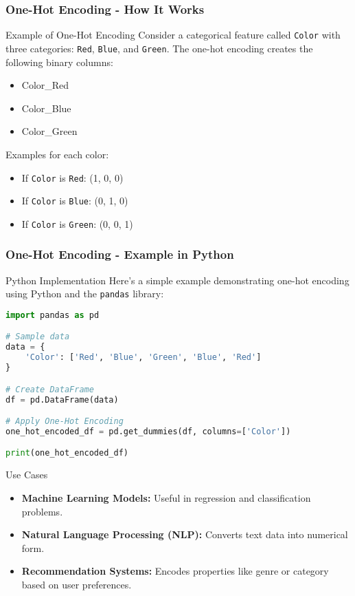 \documentclass[aspectratio=169]{beamer}
\begin{document}
\begin{frame}[fragile]
    \frametitle{One-Hot Encoding - How It Works}
    \begin{block}{Example of One-Hot Encoding}
        Consider a categorical feature called \texttt{Color} with three categories: 
        \texttt{Red}, \texttt{Blue}, and \texttt{Green}. The one-hot encoding creates 
        the following binary columns:
        \begin{itemize}
            \item Color\_Red
            \item Color\_Blue
            \item Color\_Green
        \end{itemize}
        
        Examples for each color:
        \begin{itemize}
            \item If \texttt{Color} is \texttt{Red}: (1, 0, 0)
            \item If \texttt{Color} is \texttt{Blue}: (0, 1, 0)
            \item If \texttt{Color} is \texttt{Green}: (0, 0, 1)
        \end{itemize}
    \end{block}
\end{frame}

\begin{frame}[fragile]
    \frametitle{One-Hot Encoding - Example in Python}
    \begin{block}{Python Implementation}
        Here’s a simple example demonstrating one-hot encoding using Python and the 
        \texttt{pandas} library:
        \begin{lstlisting}[language=Python]
import pandas as pd

# Sample data
data = {
    'Color': ['Red', 'Blue', 'Green', 'Blue', 'Red']
}

# Create DataFrame
df = pd.DataFrame(data)

# Apply One-Hot Encoding
one_hot_encoded_df = pd.get_dummies(df, columns=['Color'])

print(one_hot_encoded_df)
        \end{lstlisting}
    \end{block}
    
    \begin{block}{Use Cases}
        \begin{itemize}
            \item \textbf{Machine Learning Models:} Useful in regression and classification problems.
            \item \textbf{Natural Language Processing (NLP):} Converts text data into numerical form.
            \item \textbf{Recommendation Systems:} Encodes properties like genre or category based on user preferences.
        \end{itemize}
    \end{block}
\end{frame}
\end{document}
